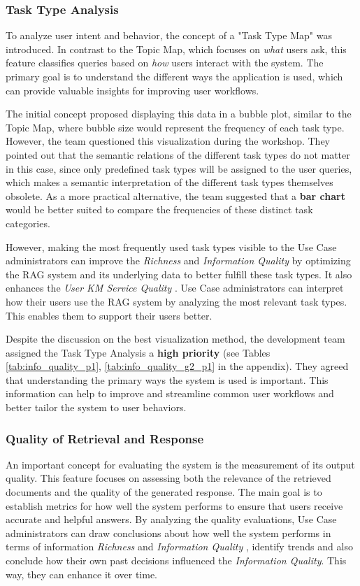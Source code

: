 \documentclass[
	english,
	ruledheaders=section,%
	class=report,%
	thesis={type=bachelor},%
	accentcolor=1b,%
	custommargins=true,%
	marginpar=false,%
	parskip=half-,%
	fontsize=11pt,%
	DIV=14,
]{tudapub}
\begin{document}
\subsubsection{Task Type Analysis}
To analyze user intent and behavior, the concept of a "Task Type Map" was introduced. In contrast to the Topic Map, which focuses on \textit{what} users ask, this feature classifies queries based on \textit{how} users interact with the system. The primary goal is to understand the different ways the application is used, which can provide valuable insights for improving user workflows.

The initial concept proposed displaying this data in a bubble plot, similar to the Topic Map, where bubble size would represent the frequency of each task type. However, the team questioned this visualization during the workshop. They pointed out that the semantic relations of the different task types do not matter in this case, since only predefined task types will be assigned to the user queries, which makes a semantic interpretation of the different task types themselves obsolete. As a more practical alternative, the team suggested that a \textbf{bar chart} would be better suited to compare the frequencies of these distinct task categories.

However, making the most frequently used task types visible to the Use Case administrators can improve the \textit{Richness} and \textit{Information Quality} \parencite[pp.~57--58]{Jennex2006} by optimizing the RAG system and its underlying data to better fulfill these task types. It also enhances the \textit{User KM Service Quality} \parencite[pp.~58--59]{Jennex2006}. Use Case administrators can interpret how their users use the RAG system by analyzing the most relevant task types. This enables them to support their users better.

Despite the discussion on the best visualization method, the development team assigned the Task Type Analysis a \textbf{high priority} (see Tables \ref{tab:info_quality_p1}, \ref{tab:info_quality_g2_p1} in the appendix). They agreed that understanding the primary ways the system is used is important. This information can help to improve and streamline common user workflows and better tailor the system to user behaviors.
\subsubsection{Quality of Retrieval and Response}
An important concept for evaluating the system is the measurement of its output quality. This feature focuses on assessing both the relevance of the retrieved documents and the quality of the generated response. The main goal is to establish metrics for how well the system performs to ensure that users receive accurate and helpful answers. By analyzing the quality evaluations, Use Case administrators can draw conclusions about how well the system performs in terms of information \textit{Richness} and \textit{Information Quality} \parencite[pp.~57--58]{Jennex2006}, identify trends and also conclude how their own past decisions influenced the \textit{Information Quality}. This way, they can enhance it over time.
\end{document}
